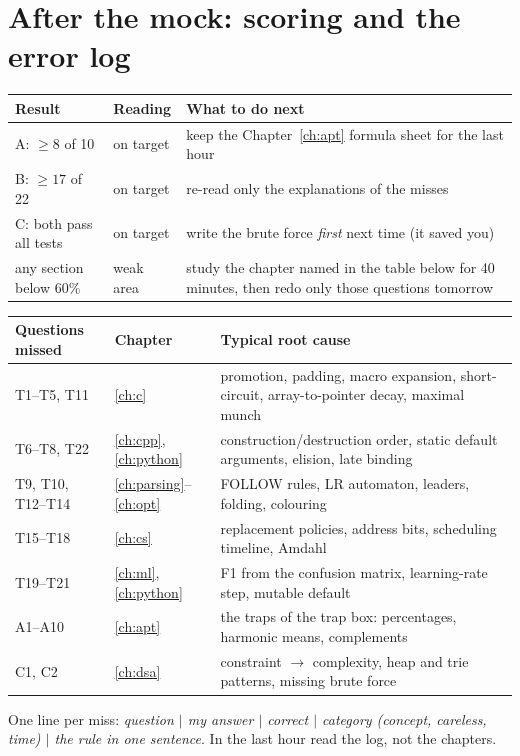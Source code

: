 \documentclass[10pt,a4paper,openany,oneside]{report}
\newcommand{\prio}[1]{\texorpdfstring{\ifcase#1\or{\color{gold}\ding{72}}\or{\color{gold}\ding{72}\ding{72}}\or{\color{gold}\ding{72}\ding{72}\ding{72}}\fi}{}}
\begin{document}
\section{After the mock: scoring and the error log \prio{3}}
\begin{center}\small
\begin{xltabular}{\textwidth}{@{}L{3.2cm}L{3.2cm}Y@{}}
\toprule
\textbf{Result} & \textbf{Reading} & \textbf{What to do next}\\
\midrule\endhead
A: $\ge8$ of 10 & on target & keep the Chapter~\ref{ch:apt} formula sheet for the last hour\\
B: $\ge17$ of 22 & on target & re-read only the explanations of the misses\\
C: both pass all tests & on target & write the brute force \emph{first} next time (it saved you)\\
any section below 60\% & weak area & study the chapter named in the table below for 40 minutes, then redo only those questions tomorrow\\
\bottomrule
\end{xltabular}
\end{center}
\begin{center}\small
\begin{xltabular}{\textwidth}{@{}L{3.6cm}L{3.4cm}Y@{}}
\toprule
\textbf{Questions missed} & \textbf{Chapter} & \textbf{Typical root cause}\\
\midrule\endhead
T1--T5, T11 & \ref{ch:c} & promotion, padding, macro expansion, short-circuit, array-to-pointer decay, maximal munch\\
T6--T8, T22 & \ref{ch:cpp}, \ref{ch:python} & construction/destruction order, static default arguments, elision, late binding\\
T9, T10, T12--T14 & \ref{ch:parsing}--\ref{ch:opt} & FOLLOW rules, LR automaton, leaders, folding, colouring\\
T15--T18 & \ref{ch:cs} & replacement policies, address bits, scheduling timeline, Amdahl\\
T19--T21 & \ref{ch:ml}, \ref{ch:python} & F1 from the confusion matrix, learning-rate step, mutable default\\
A1--A10 & \ref{ch:apt} & the traps of the trap box: percentages, harmonic means, complements\\
C1, C2 & \ref{ch:dsa} & constraint $\to$ complexity, heap and trie patterns, missing brute force\\
\bottomrule
\end{xltabular}
\end{center}
\begin{tipbox}
One line per miss: \emph{question $\mid$ my answer $\mid$ correct $\mid$ category (concept, careless, time) $\mid$ the rule in one sentence}. In the last hour read the log, not the chapters.
\end{tipbox}
\end{document}
